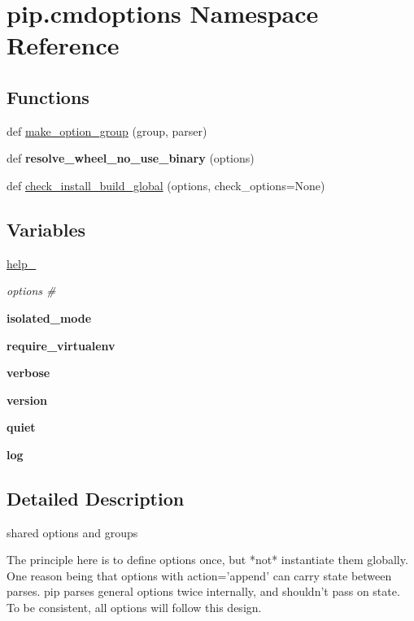 \hypertarget{namespacepip_1_1cmdoptions}{}\section{pip.\+cmdoptions Namespace Reference}
\label{namespacepip_1_1cmdoptions}
\subsection*{Functions}
\begin{DoxyCompactItemize}
\item 
def \hyperlink{namespacepip_1_1cmdoptions_a4933ebcd6ce60db8d069607901312dd7}{make\+\_\+option\+\_\+group} (group, parser)
\item 
\mbox{\label{namespacepip_1_1cmdoptions_a4e4656b9503c3bff3e638f5698b059e8}} 
def {\bfseries resolve\+\_\+wheel\+\_\+no\+\_\+use\+\_\+binary} (options)
\item 
def \hyperlink{namespacepip_1_1cmdoptions_afcf275e5a138ede6ea6a569ff211aded}{check\+\_\+install\+\_\+build\+\_\+global} (options, check\+\_\+options=None)
\end{DoxyCompactItemize}
\subsection*{Variables}
\begin{DoxyCompactItemize}
\item 
\hyperlink{namespacepip_1_1cmdoptions_aecd6fe12bddb7700267409378e3f1bc6}{help\+\_\+}
\begin{DoxyCompactList}\small\item\em options \# \end{DoxyCompactList}\item 
{\bfseries isolated\+\_\+mode}
\item 
{\bfseries require\+\_\+virtualenv}
\item 
{\bfseries verbose}
\item 
{\bfseries version}
\item 
{\bfseries quiet}
\item 
{\bfseries log}
\end{DoxyCompactItemize}


\subsection{Detailed Description}
\begin{DoxyVerb}shared options and groups

The principle here is to define options once, but *not* instantiate them
globally. One reason being that options with action='append' can carry state
between parses. pip parses general options twice internally, and shouldn't
pass on state. To be consistent, all options will follow this design.\end{DoxyVerb}
 

